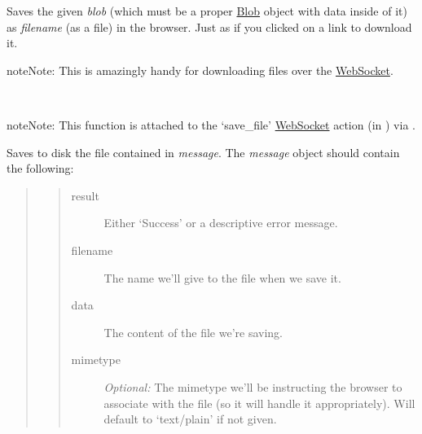 \documentclass[letterpaper,10pt,openany]{sphinxmanual}
\begin{document}
\begin{fulllineitems}
\begin{fulllineitems}
\begin{fulllineitems}
\label{Developer/js_gateone:GateOne.Utils.saveAs}
Saves the given \emph{blob} (which must be a proper \href{https://developer.mozilla.org/en/DOM/Blob}{Blob} object with data inside of it) as \emph{filename} (as a file) in the browser.  Just as if you clicked on a link to download it.

\begin{notice}{note}{Note:}
This is amazingly handy for downloading files over the \href{https://developer.mozilla.org/en/WebSockets/WebSockets\_reference/WebSocket}{WebSocket}.
\end{notice}

\end{fulllineitems}



\begin{fulllineitems}
\label{Developer/js_gateone:GateOne.Utils.saveAsAction}~
\begin{notice}{note}{Note:}
This function is attached to the `save\_file' \href{https://developer.mozilla.org/en/WebSockets/WebSockets\_reference/WebSocket}{WebSocket} action (in {\hyperref[Developer/js_gateone:GateOne.Net.actions]{}}) via {\hyperref[Developer/js_gateone:GateOne.Utils.init]{}}.
\end{notice}

Saves to disk the file contained in \emph{message}.  The \emph{message} object should contain the following:
\begin{quote}
\begin{quote}\begin{description}
\item[{result}] \leavevmode
Either `Success' or a descriptive error message.

\item[{filename}] \leavevmode
The name we'll give to the file when we save it.

\item[{data}] \leavevmode
The content of the file we're saving.

\item[{mimetype}] \leavevmode
\emph{Optional:}  The mimetype we'll be instructing the browser to associate with the file (so it will handle it appropriately).  Will default to `text/plain' if not given.


\end{description}
\end{quote}
\end{quote}
\end{fulllineitems}
\end{fulllineitems}
\end{fulllineitems}
\end{document}
